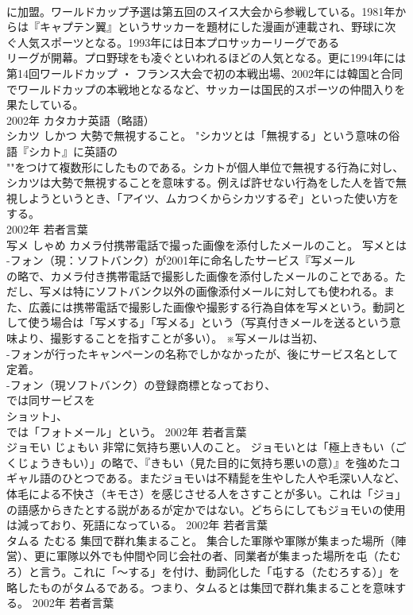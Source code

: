\documentclass[8pt]{extreport}
\begin{document}
\begin{CJK}{UTF8}{min}
\\	に加盟。ワールドカップ予選は第五回のスイス大会から参戦している。1981年からは『キャプテン翼』というサッカーを題材にした漫画が連載され、野球に次ぐ人気スポーツとなる。1993年には日本プロサッカーリーグである
\\	リーグが開幕。プロ野球をも凌ぐといわれるほどの人気となる。更に1994年には第14回ワールドカップ ・ フランス大会で初の本戦出場、2002年には韓国と合同でワールドカップの本戦地となるなど、サッカーは国民的スポーツの仲間入りを果たしている。
\\	2002年	カタカナ英語（略語）	
\\	シカツ	しかつ	大勢で無視すること。	"シカツとは「無視する」という意味の俗語『シカト』に英語の
\\	""をつけて複数形にしたものである。シカトが個人単位で無視する行為に対し、シカツは大勢で無視することを意味する。例えば許せない行為をした人を皆で無視しようというとき、「アイツ、ムカつくからシカツするぞ」といった使い方をする。
\\	2002年	若者言葉	
\\	写メ	しゃめ	カメラ付携帯電話で撮った画像を添付したメールのこと。	写メとは
\\	-フォン（現：ソフトバンク）が2001年に命名したサービス『写メール
\\	の略で、カメラ付き携帯電話で撮影した画像を添付したメールのことである。ただし、写メは特にソフトバンク以外の画像添付メールに対しても使われる。また、広義には携帯電話で撮影した画像や撮影する行為自体を写メという。動詞として使う場合は「写メする」「写メる」という（写真付きメールを送るという意味より、撮影することを指すことが多い）。 ※写メールは当初、
\\	-フォンが行ったキャンペーンの名称でしかなかったが、後にサービス名として定着。
\\	-フォン（現ソフトバンク）の登録商標となっており、
\\	では同サービスを
\\	ショット」、
\\	では「フォトメール」という。	2002年	若者言葉	
\\	ジョモい	じょもい	非常に気持ち悪い人のこと。	ジョモいとは「極上きもい（ごくじょうきもい）」の略で、『きもい（見た目的に気持ち悪いの意）』を強めたコギャル語のひとつである。またジョモいは不精髭を生やした人や毛深い人など、体毛による不快さ（キモさ）を感じさせる人をさすことが多い。これは「ジョ」の語感からきたとする説があるが定かではない。どちらにしてもジョモいの使用は減っており、死語になっている。	2002年	若者言葉	
\\	タムる	たむる	集団で群れ集まること。	集合した軍隊や軍隊が集まった場所（陣営）、更に軍隊以外でも仲間や同じ会社の者、同業者が集まった場所を屯（たむろ）と言う。これに「～する」を付け、動詞化した「屯する（たむろする）」を略したものがタムるである。つまり、タムるとは集団で群れ集まることを意味する。	2002年	若者言葉	

\end{CJK}
\end{document}
